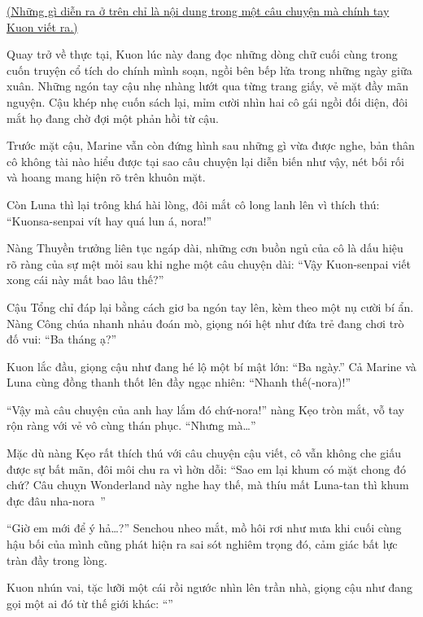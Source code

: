 \documentclass[../main.tex]{subfiles}
\begin{document}
\omk

\begin{center}
  \uline{(Những gì diễn ra ở trên chỉ là nội dung trong một câu chuyện mà chính tay Kuon viết ra.)}
\end{center}

Quay trở về thực tại, Kuon lúc này đang đọc những dòng chữ cuối cùng trong cuốn truyện cổ tích do chính mình soạn, ngồi bên bếp lửa trong những ngày giữa xuân. Những ngón tay cậu nhẹ nhàng lướt qua từng trang giấy, vẻ mặt đầy mãn nguyện. Cậu khép nhẹ cuốn sách lại, mỉm cười nhìn hai cô gái ngồi đối diện, đôi mắt họ đang chờ đợi một phản hồi từ cậu.

Trước mặt cậu, Marine vẫn còn đứng hình sau những gì vừa được nghe, bản thân cô không tài nào hiểu được tại sao câu chuyện lại diễn biến như vậy, nét bối rối và hoang mang hiện rõ trên khuôn mặt.

Còn Luna thì lại trông khá hài lòng, đôi mắt cô long lanh lên vì thích thú: ``Kuonsa-senpai vít hay quá lun á, nora!''

Nàng Thuyền trưởng liên tục ngáp dài, những cơn buồn ngủ của cô là dấu hiệu rõ ràng của sự mệt mỏi sau khi nghe một câu chuyện dài: ``Vậy Kuon-senpai viết xong cái này mất bao lâu thế?''

Cậu Tổng chỉ đáp lại bằng cách giơ ba ngón tay lên, kèm theo một nụ cười bí ẩn. Nàng Công chúa nhanh nhảu đoán mò, giọng nói hệt như đứa trẻ đang chơi trò đố vui: ``Ba tháng ạ?''

Kuon lắc đầu, giọng cậu như đang hé lộ một bí mật lớn: ``Ba ngày.'' Cả Marine và Luna cùng đồng thanh thốt lên đầy ngạc nhiên: ``Nhanh thế(-nora)!''

``Vậy mà câu chuyện của anh hay lắm đó chứ-nora!'' nàng Kẹo tròn mắt, vỗ tay rộn ràng với vẻ vô cùng thán phục. ``Nhưng mà\dots''

Mặc dù nàng Kẹo rất thích thú với câu chuyện cậu viết, cô vẫn không che giấu được sự bất mãn, đôi môi chu ra vì hờn dỗi: ``Sao em lại khum có mặt chong đó chứ? Câu chuỵn Wonderland này nghe hay thế, mà thíu mất Luna-tan thì khum đực đâu nha-nora~{}''

``Giờ em mới để ý hả\dots?'' Senchou nheo mắt, mồ hôi rơi như mưa khi cuối cùng hậu bối của mình cũng phát hiện ra sai sót nghiêm trọng đó, cảm giác bất lực tràn đầy trong lòng.

Kuon nhún vai, tặc lưỡi một cái rồi ngước nhìn lên trần nhà, giọng cậu như đang gọi một ai đó từ thế giới khác: ``''
\end{document}
